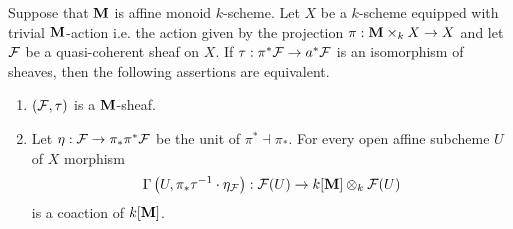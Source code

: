 \begin{proposition}\label{proposition:equivariant_sheaves_on_schemes_with_trivial_actions}
Suppose that $\mathbf{M}$ is affine monoid $k$-scheme. Let $X$ be a $k$-scheme equipped with trivial $\mathbf{M}$-action i.e. the action given by the projection $\pi:\mathbf{M}\times_kX\rightarrow X$ and let ${\mathcal F}$ be a quasi-coherent sheaf on $X$. If $\tau:\pi^*{\mathcal F}\rightarrow a^*{\mathcal F}$ is an isomorphism of sheaves, then the following assertions are equivalent.
\begin{enumerate}[label= \emph{\textbf{(\roman*)}}, leftmargin=3.0em]
\item $({\mathcal F},\tau)$ is a $\mathbf{M}$-sheaf.
\item Let $\eta:{\mathcal F}\rightarrow \pi_*\pi^*{\mathcal F}$ be the unit of $\pi^* \dashv \pi_*$. For every open affine subcheme $U$ of $X$ morphism
$$\Gamma\left(U,\pi_*\tau^{-1}\cdot \eta_{{\mathcal F}}\right):{\mathcal F}(U)\rightarrow k[\mathbf{M}]\otimes_k{\mathcal F}(U)$$
is a coaction of $k[\mathbf{M}]$.
\end{enumerate}
\end{proposition}
